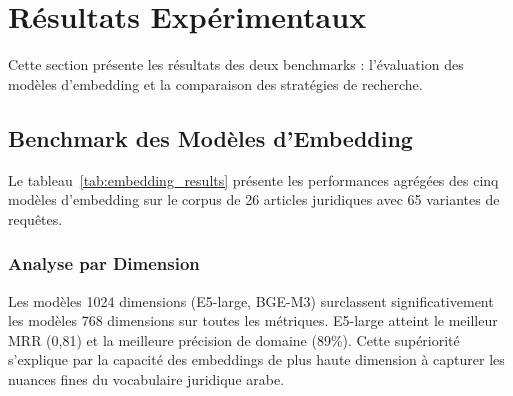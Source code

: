 \section{Résultats Expérimentaux}

Cette section présente les résultats des deux benchmarks : l'évaluation des
modèles d'embedding et la comparaison des stratégies de recherche.

\subsection{Benchmark des Modèles d'Embedding}

Le tableau~\ref{tab:embedding_results} présente les performances agrégées
des cinq modèles d'embedding sur le corpus de 26 articles juridiques avec
65 variantes de requêtes.

\begin{table}[H]
\centering
\caption{Résultats du benchmark des modèles d'embedding}
\label{tab:embedding_results}
\end{table}

\subsubsection{Analyse par Dimension}

Les modèles 1024 dimensions (E5-large, BGE-M3) surclassent significativement
les modèles 768 dimensions sur toutes les métriques. E5-large atteint le
meilleur MRR (0,81) et la meilleure précision de domaine (89\%). Cette
supériorité s'explique par la capacité des embeddings de plus haute dimension
à capturer les nuances fines du vocabulaire juridique arabe.

